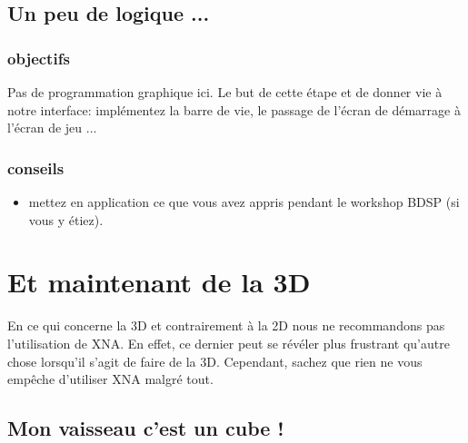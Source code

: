 \documentclass[12pt,a4paper]{report}
\begin{document}
\section{Un peu de logique ...}
\subsection{objectifs}
Pas de programmation graphique ici. Le but de cette étape et de donner vie à notre interface:
implémentez la barre de vie, le passage de l'écran de démarrage à l'écran de jeu ...
\subsection{conseils}
\begin{itemize}
\item mettez en application ce que vous avez appris pendant le workshop BDSP (si vous y étiez).
\end{itemize}
\newpage

\chapter{Et maintenant de la 3D}
En ce qui concerne la 3D et contrairement à la 2D nous ne recommandons pas l'utilisation de XNA.
En effet, ce dernier peut se révéler plus frustrant qu'autre chose lorsqu'il s'agit de faire de la 3D.
Cependant, sachez que rien ne vous empêche d'utiliser XNA malgré tout.

\section{Mon vaisseau c'est un cube !}
\end{document}
